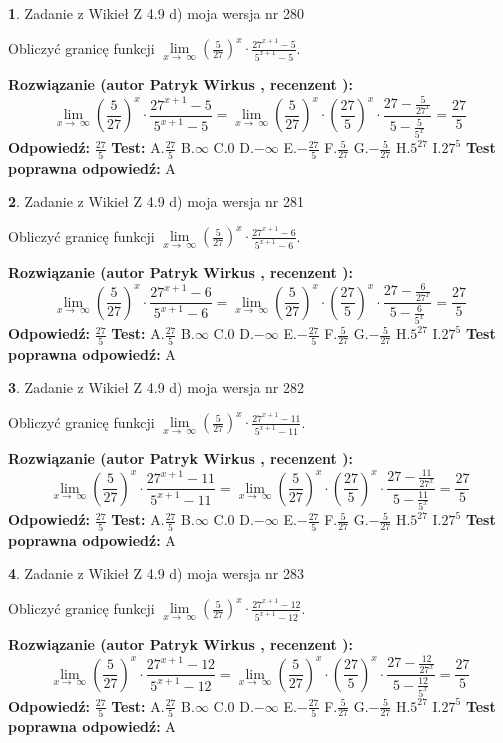 \documentclass[12pt, a4paper]{article}
\theoremstyle{definition} %
\newtheorem{zad}{}
\newcommand{\zadStart}[1]{\begin{zad}#1\newline}
\newcommand{\zadStop}{\end{zad}}
\newcommand{\rozwStart}[2]{\noindent \textbf{Rozwiązanie (autor #1 , recenzent #2): }\newline}
\newcommand{\rozwStop}{\newline}
\newcommand{\odpStart}{\noindent \textbf{Odpowiedź:}\newline}
\newcommand{\odpStop}{\newline}
\newcommand{\testStart}{\noindent \textbf{Test:}\newline}
\newcommand{\testStop}{\newline}
\newcommand{\kluczStart}{\noindent \textbf{Test poprawna odpowiedź:}\newline}
\newcommand{\kluczStop}{\newline}
\begin{document}
\zadStart{Zadanie z Wikieł Z 4.9 d) moja wersja nr 280}


Obliczyć granicę funkcji  $\lim\limits_{x\to\ \infty}(\frac{5}{27})^{x}\cdot\frac{27^{x+1}-5}{5^{x+1}-5}$.
\zadStop
\rozwStart{Patryk Wirkus}{}
$$\lim\limits_{x\to\ \infty}(\frac{5}{27})^{x}\cdot\frac{27^{x+1}-5}{5^{x+1}-5}=\lim\limits_{x\to\ \infty}(\frac{5}{27})^{x}\cdot(\frac{27}{5})^{x} \cdot \frac{27-\frac{5}{27^{x}}}{5-\frac{5}{5^{x}}} = \frac{27}{5}$$
\rozwStop
\odpStart
$\frac{27}{5}$
\odpStop
\testStart
A.$\frac{27}{5}$ B.$\infty$ C.$0$ D.$-\infty$ E.$-\frac{27}{5}$
F.$\frac{5}{27}$ G.$-\frac{5}{27}$
H.$5^{27}$
I.$27^{5}$
\testStop
\kluczStart
A
\kluczStop



\zadStart{Zadanie z Wikieł Z 4.9 d) moja wersja nr 281}


Obliczyć granicę funkcji  $\lim\limits_{x\to\ \infty}(\frac{5}{27})^{x}\cdot\frac{27^{x+1}-6}{5^{x+1}-6}$.
\zadStop
\rozwStart{Patryk Wirkus}{}
$$\lim\limits_{x\to\ \infty}(\frac{5}{27})^{x}\cdot\frac{27^{x+1}-6}{5^{x+1}-6}=\lim\limits_{x\to\ \infty}(\frac{5}{27})^{x}\cdot(\frac{27}{5})^{x} \cdot \frac{27-\frac{6}{27^{x}}}{5-\frac{6}{5^{x}}} = \frac{27}{5}$$
\rozwStop
\odpStart
$\frac{27}{5}$
\odpStop
\testStart
A.$\frac{27}{5}$ B.$\infty$ C.$0$ D.$-\infty$ E.$-\frac{27}{5}$
F.$\frac{5}{27}$ G.$-\frac{5}{27}$
H.$5^{27}$
I.$27^{5}$
\testStop
\kluczStart
A
\kluczStop



\zadStart{Zadanie z Wikieł Z 4.9 d) moja wersja nr 282}


Obliczyć granicę funkcji  $\lim\limits_{x\to\ \infty}(\frac{5}{27})^{x}\cdot\frac{27^{x+1}-11}{5^{x+1}-11}$.
\zadStop
\rozwStart{Patryk Wirkus}{}
$$\lim\limits_{x\to\ \infty}(\frac{5}{27})^{x}\cdot\frac{27^{x+1}-11}{5^{x+1}-11}=\lim\limits_{x\to\ \infty}(\frac{5}{27})^{x}\cdot(\frac{27}{5})^{x} \cdot \frac{27-\frac{11}{27^{x}}}{5-\frac{11}{5^{x}}} = \frac{27}{5}$$
\rozwStop
\odpStart
$\frac{27}{5}$
\odpStop
\testStart
A.$\frac{27}{5}$ B.$\infty$ C.$0$ D.$-\infty$ E.$-\frac{27}{5}$
F.$\frac{5}{27}$ G.$-\frac{5}{27}$
H.$5^{27}$
I.$27^{5}$
\testStop
\kluczStart
A
\kluczStop



\zadStart{Zadanie z Wikieł Z 4.9 d) moja wersja nr 283}


Obliczyć granicę funkcji  $\lim\limits_{x\to\ \infty}(\frac{5}{27})^{x}\cdot\frac{27^{x+1}-12}{5^{x+1}-12}$.
\zadStop
\rozwStart{Patryk Wirkus}{}
$$\lim\limits_{x\to\ \infty}(\frac{5}{27})^{x}\cdot\frac{27^{x+1}-12}{5^{x+1}-12}=\lim\limits_{x\to\ \infty}(\frac{5}{27})^{x}\cdot(\frac{27}{5})^{x} \cdot \frac{27-\frac{12}{27^{x}}}{5-\frac{12}{5^{x}}} = \frac{27}{5}$$
\rozwStop
\odpStart
$\frac{27}{5}$
\odpStop
\testStart
A.$\frac{27}{5}$ B.$\infty$ C.$0$ D.$-\infty$ E.$-\frac{27}{5}$
F.$\frac{5}{27}$ G.$-\frac{5}{27}$
H.$5^{27}$
I.$27^{5}$
\testStop
\kluczStart
A
\kluczStop
\end{document}
